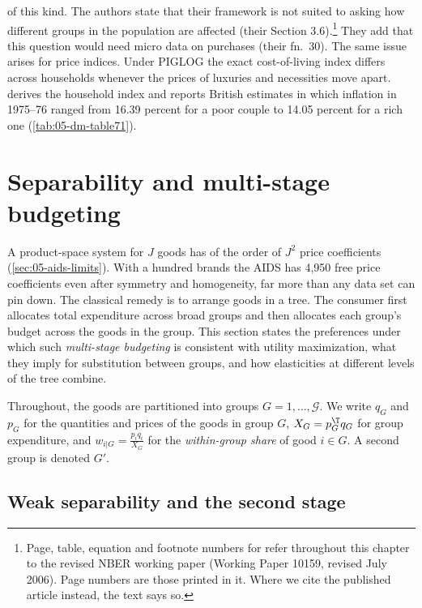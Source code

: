 \begin{remark}
of this kind. The authors state that their framework is not suited to asking how different groups in the
population are affected (their Section 3.6).\footnote{Page, table, equation and footnote numbers for
\citet{ChaudhuriGoldbergJia2006} refer throughout this chapter to the revised NBER working paper (Working Paper
10159, revised July 2006). Page numbers are those printed in it. Where we cite the published article instead, the
text says so.} They add that this
question would need micro data on purchases (their fn.~30). The same issue arises for price indices.
Under PIGLOG the exact cost-of-living index differs across households whenever the prices of luxuries
and necessities move apart.  derives the household index and reports British
estimates in which inflation in 1975--76 ranged from 16.39 percent for a poor couple to 14.05 percent for
a rich one (\cref{tab:05-dm-table71}).
\end{remark}

\section{Separability and multi-stage budgeting}\label{sec:05-separability}

A product-space system for $J$ goods has of the order of $J^2$ price coefficients
(\cref{sec:05-aids-limits}). With a hundred brands the AIDS has 4,950 free price coefficients even after
symmetry and homogeneity, far more than any data set can pin down. The classical remedy is to arrange
goods in a tree. The consumer first allocates total expenditure across broad groups and then allocates
each group's budget across the goods in the group. This section states the preferences under which such
\emph{multi-stage budgeting} is consistent with utility maximization, what they imply for substitution
between groups, and how elasticities at different levels of the tree combine.

Throughout, the goods are partitioned into groups $G = 1, \dots, \mathcal{G}$. We write $q_G$ and $p_G$
for the quantities and prices of the goods in group $G$, $X_G = p_G^{\T} q_G$ for group expenditure, and
$w_{i|G} = \frac{p_i q_i}{X_G}$ for the \emph{within-group share} of good $i \in G$. A second group is
denoted $G'$.

\subsection{Weak separability and the second stage}\label{sec:05-second-stage}

